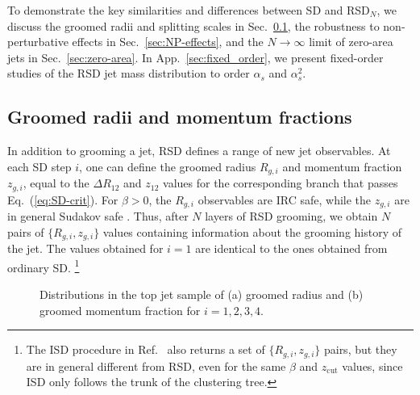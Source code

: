 \documentclass[11pt,a4paper]{article}
\newcommand{\zcut}{z_\text{cut}}
\DeclareRobustCommand{\Sec}[1]{Sec.~\ref{#1}}
\DeclareRobustCommand{\App}[1]{App.~\ref{#1}}
\DeclareRobustCommand{\Eq}[1]{Eq.~(\ref{#1})}
\DeclareRobustCommand{\Ref}[1]{Ref.~\cite{#1}}
\begin{document}
To demonstrate the key similarities and differences between SD and RSD$_N$, we discuss the groomed radii and splitting scales in \Sec{sec:radius}, the robustness to non-perturbative effects in
\Sec{sec:NP-effects}, and the $N\rightarrow \infty$ limit of zero-area jets in \Sec{sec:zero-area}.
%
In \App{sec:fixed_order}, we present fixed-order studies of the RSD jet mass distribution to order $\alpha_s$ and $\alpha_s^2$.

\subsection{Groomed radii and momentum fractions}
\label{sec:radius}

In addition to grooming a jet, RSD defines a range of new jet
observables.
%
At each SD step $i$, one can define the groomed radius $R_{g,i}$
and momentum fraction $z_{g,i}$, equal to the $\Delta R_{12}$ and
$z_{12}$ values for the corresponding branch that passes
\Eq{eq:SD-crit}.
%
For $\beta > 0$, the $R_{g,i}$ observables are IRC safe, while the $z_{g,i}$ are in general Sudakov safe \cite{Larkoski:2015lea}.
%
Thus, after $N$ layers of RSD grooming, we obtain $N$ pairs of $\{R_{g,i}, z_{g,i} \}$ values containing information about the grooming history of the jet.
%
The values obtained for $i = 1$ are identical to the ones obtained from ordinary SD.%
%
\footnote{The ISD procedure in \Ref{Frye:2017yrw} also returns a set of $\{R_{g,i}, z_{g,i} \}$ pairs, but they are in general different from RSD, even for the same $\beta$ and $\zcut$ values, since ISD only follows the trunk of the clustering tree.}  

\begin{figure}[t]
  \centering
  \qquad
  \caption{Distributions in the top jet sample of (a) groomed radius and (b) groomed momentum fraction for $i=1,2,3,4$.}
  \label{fig:top-rsd-internal}
\end{figure}
\end{document}
